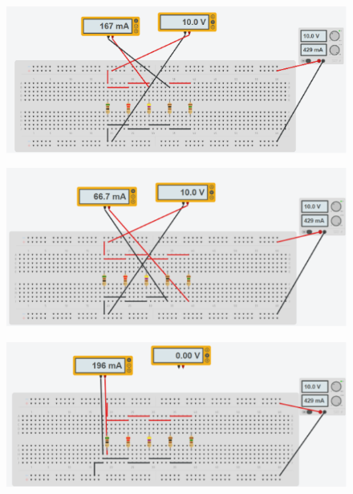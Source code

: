 \begin{figure}[H]
\begin{minipage}{0.45\textwidth}
      \label{fig: Simulacion Conexion Paralelo B}
    \end{minipage}
    \hfill
    \begin{minipage}{0.45\textwidth}
      \centering
      \includegraphics[width=\textwidth]{Figures/1. Content/simulation/paraleloC.png}
      \label{fig: Simulacion Conexion Paralelo C}
    \end{minipage}
    \hfill
    \begin{minipage}{0.45\textwidth}
      \centering
      \includegraphics[width=\textwidth]{Figures/1. Content/simulation/paraleloD.png}
      \label{fig: Simulacion Conexion Paralelo D}
    \end{minipage}
    \hfill
    \begin{minipage}{0.45\textwidth}
      \centering
      \includegraphics[width=\textwidth]{Figures/1. Content/simulation/paraleloAR1.png}

\end{minipage}
\end{figure}
